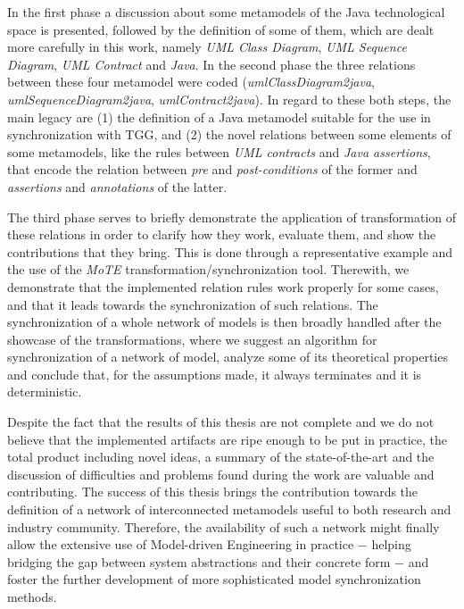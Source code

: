 \documentclass[tuberlin,cic,tc,english,noabntcite,oneside]{iiufrgs}
\begin{document}
In the first phase a discussion about some metamodels of the Java technological space is presented, followed by the definition of some of them, which are dealt more carefully in this work, namely \emph{UML Class Diagram}, \emph{UML Sequence Diagram}, \emph{UML Contract} and \emph{Java}. In the second phase the three relations between these four metamodel were coded (\emph{umlClassDiagram2java}, \emph{umlSequenceDiagram2java}, \emph{umlContract2java}). In regard to these both steps, the main legacy are (1) the definition of a Java metamodel suitable for the use in synchronization with TGG, and (2) the novel relations between some elements of some metamodels, like the rules between \emph{UML contracts} and \emph{Java assertions}, that encode the relation between \emph{pre} and \emph{post-conditions} of the former and \emph{assertions} and \emph{annotations} of the latter.

The third phase serves to briefly demonstrate the application of transformation of these relations in order to clarify how they work, evaluate them, and show the contributions that they bring. This is done through a representative example and the use of the \emph{MoTE} transformation/synchronization tool. Therewith, we demonstrate that the implemented relation rules work properly for some cases, and that it leads towards the synchronization of such relations. The synchronization of a whole network of models is then broadly handled after the showcase of the transformations, where we suggest an algorithm for synchronization of a network of model, analyze some of its theoretical properties and conclude that, for the assumptions made, it always terminates and it is deterministic.

Despite the fact that the results of this thesis are not complete and we do not believe that the implemented artifacts are ripe enough to be put in practice, the total product including novel ideas, a summary of the state-of-the-art and the discussion of difficulties and problems found during the work are valuable and contributing. The success of this thesis brings the contribution towards the definition of a network of interconnected metamodels useful to both research and industry community. Therefore, the availability of such a network might finally allow the extensive use of Model-driven Engineering in practice $-$ helping bridging the gap between system abstractions and their concrete form $-$ and foster the further development of more sophisticated model synchronization methods.




\end{document}
